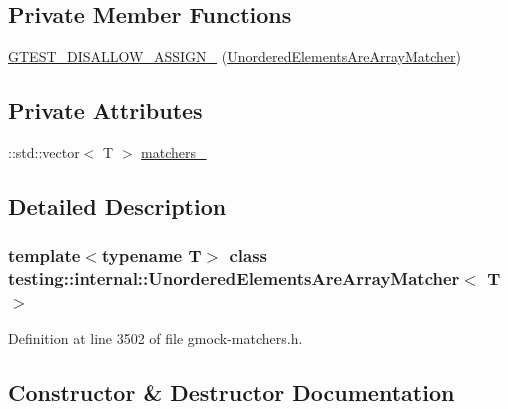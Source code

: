 \subsection*{Private Member Functions}
\begin{DoxyCompactItemize}
\item 
\hyperlink{classtesting_1_1internal_1_1UnorderedElementsAreArrayMatcher_ab8e795d461910e9d4e10b4360afd6d80}{G\+T\+E\+S\+T\+\_\+\+D\+I\+S\+A\+L\+L\+O\+W\+\_\+\+A\+S\+S\+I\+G\+N\+\_\+} (\hyperlink{classtesting_1_1internal_1_1UnorderedElementsAreArrayMatcher}{Unordered\+Elements\+Are\+Array\+Matcher})
\end{DoxyCompactItemize}
\subsection*{Private Attributes}
\begin{DoxyCompactItemize}
\item 
\+::std\+::vector$<$ T $>$ \hyperlink{classtesting_1_1internal_1_1UnorderedElementsAreArrayMatcher_ab671d76fb1e06755245814635a27c025}{matchers\+\_\+}
\end{DoxyCompactItemize}


\subsection{Detailed Description}
\subsubsection*{template$<$typename T$>$\newline
class testing\+::internal\+::\+Unordered\+Elements\+Are\+Array\+Matcher$<$ T $>$}



Definition at line 3502 of file gmock-\/matchers.\+h.



\subsection{Constructor \& Destructor Documentation}
\mbox{\label{classtesting_1_1internal_1_1UnorderedElementsAreArrayMatcher_a2a732fdc8ba5918a5337b11df3c556f3}} 
